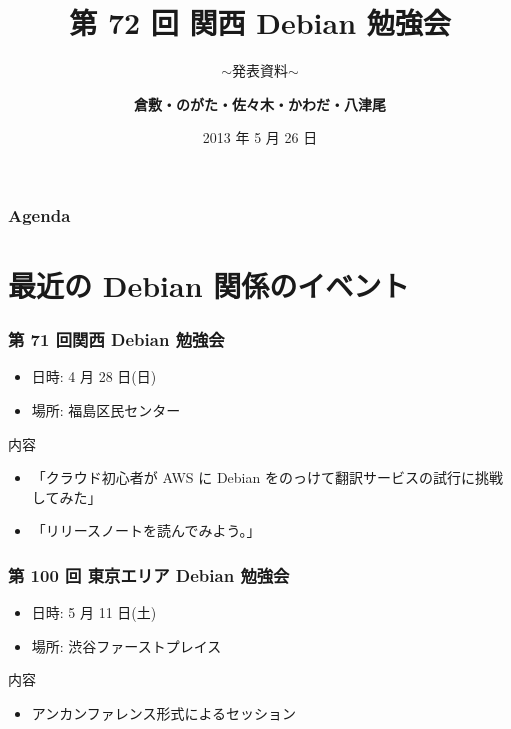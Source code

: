 \documentclass[cjk,dvipdfmx,10pt,compress,%
hyperref={bookmarks=true,bookmarksnumbered=true,bookmarksopen=false,%
colorlinks=false,%
pdftitle={第 72 回 関西 Debian 勉強会},%
pdfauthor={倉敷・のがた・佐々木・かわだ・八津尾},%
pdfsubject={資料},%
}]{beamer}
\title{第 72 回 関西 Debian 勉強会}
\subtitle{$\sim$発表資料$\sim$}
\author[かわだ てつたろう]{{\large\bf 倉敷・のがた・佐々木・かわだ・八津尾}}
\institute[Debian JP]{{\normalsize\tt 関西 Debian 勉強会}}
\date{{\small 2013 年 5 月 26 日}}
\begin{document}
\settitleslide
\begin{frame}
\titlepage
\end{frame}
\setdefaultslide



\begin{frame}[fragile]
\frametitle{Agenda}

\tableofcontents

\end{frame}

\section{最近の Debian 関係のイベント}


\begin{frame}[fragile]
  \frametitle{第 71 回関西 Debian 勉強会}
  \begin{itemize}
  \item 日時: 4 月 28 日(日)
  \item 場所: 福島区民センター
  \end{itemize}
  \begin{block}{内容}
    \begin{itemize}
    \item 「クラウド初心者が AWS に Debian をのっけて翻訳サービスの試行に挑戦してみた」
    \item 「リリースノートを読んでみよう。」
    \end{itemize}
  \end{block}
\end{frame}

\begin{frame}[fragile]
  \frametitle{第 100 回 東京エリア Debian 勉強会}
  \begin{itemize}
  \item 日時: 5 月 11 日(土)
  \item 場所: 渋谷ファーストプレイス
  \end{itemize}
  \begin{block}{内容}
    \begin{itemize}
    \item アンカンファレンス形式によるセッション
    \end{itemize}
  \end{block}
\end{frame}
\end{document}
